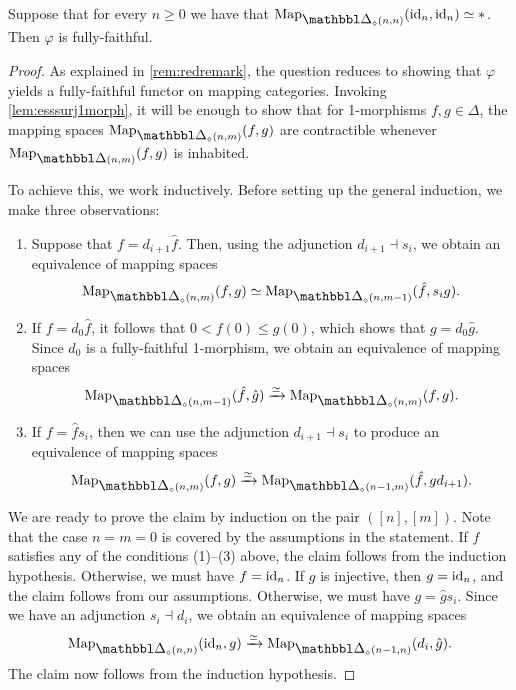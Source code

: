 \documentclass[a4paper,reqno,twoside]{amsart}
\begin{document}
\begin{lemma}\label{lem:keyreduction2simplex}
	Suppose that for every $n\geq 0$ we have that $\Map_{\ddelta_{\diamond}(n,n)}(\id_n,\id_n)\simeq *$. Then $\varphi$ is fully-faithful.
\end{lemma}
\begin{proof}
	As explained in \cref{rem:redremark}, the question reduces to showing that $\varphi$ yields a fully-faithful functor on mapping categories. Invoking \cref{lem:esssurj1morph}, it will be enough to show that for 1-morphisms $f,g \in \Delta$, the mapping spaces $\Map_{\ddelta_{\diamond}(n,m)}(f,g)$ are contractible whenever $\Map_{\ddelta(n,m)}(f,g)$ is inhabited.

	To achieve this, we work inductively. Before setting up the general induction, we make three observations:
	\begin{enumerate}
		\item Suppose that $f=d_{i+1}\hat{f}$. Then, using the adjunction $d_{i+1}\dashv s_i$, we obtain an equivalence of mapping spaces
	\[
		\Map_{\ddelta_{\diamond}(n,m)}(f,g) \simeq \Map_{\ddelta_{\diamond}(n,m-1)}(\hat{f},s_ig).
	\]
	   \item If $f=d_0\hat{f}$, it follows that $0<f(0)\leq g(0)$, which shows that $g=d_0 \hat{g}$. Since $d_0$ is a fully-faithful 1-morphism, we obtain an equivalence of mapping spaces
	\[
		\Map_{\ddelta_{\diamond}(n,m-1)}(\hat{f},\hat{g})\xrightarrow{\simeq}\Map_{\ddelta_{\diamond}(n,m)}(f,g).
	\]
	 \item If $f=\hat{f}s_i$, then we can use the adjunction $d_{i+1}\dashv s_i$ to produce an equivalence of mapping spaces
	 \[
		\Map_{\ddelta_{\diamond}(n,m)}(f,g)\xrightarrow{\simeq}\Map_{\ddelta_{\diamond}(n-1,m)}(\hat{f},gd_{i+1}).
	 \]
	\end{enumerate}
	We are ready to prove the claim by induction on the pair $([n],[m])$. Note that the case $n=m=0$ is covered by the assumptions in the statement. If $f$ satisfies any of the conditions (1)--(3) above, the claim follows from the induction hypothesis. Otherwise, we must have $f=\mathrm{id}_n$. If $g$ is injective, then $g=\mathrm{id}_n$, and the claim follows from our assumptions. Otherwise, we must have $g=\hat{g}s_i$. Since we have an adjunction $s_i \dashv d_i$, we obtain an equivalence of mapping spaces
	\[
		\Map_{\ddelta_{\diamond}(n,n)}(\id_n,g) \xrightarrow{\simeq}\Map_{\ddelta_{\diamond}(n-1,n)}(d_i,\hat{g}).
	\]
	The claim now follows from the induction hypothesis.
\end{proof}
\end{document}
